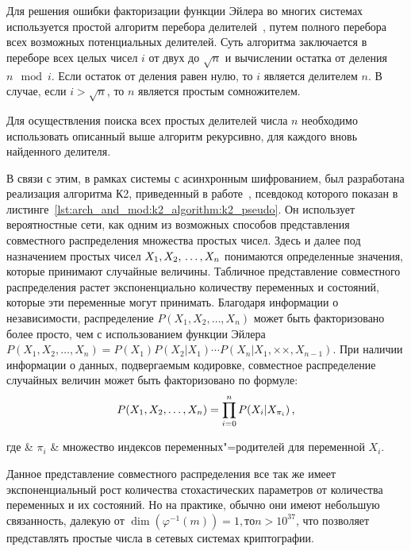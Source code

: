 Для решения ошибки факторизации функции Эйлера во многих системах используется простой алгоритм перебора делителей~\cite{algo_differ}, путем полного перебора всех возможных потенциальных делителей. Суть алгоритма заключается в переборе всех целых чисел $ i $ от двух до $ \sqrt{n} $ и вычислении остатка от деления $ n \mod i $. Если остаток от деления равен нулю, то $i$ является делителем $n$. В случае, если $i > \sqrt{n}$, то $n$ является простым сомножителем.

Для осуществления поиска всех простых делителей числа $n$ необходимо использовать описанный выше алгоритм рекурсивно, для каждого вновь найденного делителя.

В связи с этим, в рамках системы с асинхронным шифрованием, был разработана реализация алгоритма К2, приведенный в работе~\cite{Cooper1991}, псевдокод которого показан в листинге~\ref{lst:arch_and_mod:k2_algorithm:k2_pseudo}.
Он использует вероятностные сети, как одним из возможных способов представления совместного распределения множества простых чисел.
Здесь и далее под назначением простых чисел $ X_1, X_2,\\ \dotsc, X_n $ понимаются определенные значения, которые принимают случайные величины.
Табличное представление совместного распределения растет экспоненциально количеству переменных и состояний, которые эти переменные могут принимать.
Благодаря информации о независимости, распределение $ P(X_1, X_2,\dotsc, X_n) $ может быть факторизовано более просто, чем с использованием функции Эйлера $ P(X_1, X_2,\dotsc, X_n) = P(X_1) P(X_2|X_1) \dotsm P(X_n|X_1,\times \times,X_{n-1}) $.
При наличии информации о данных, подвергаемым кодировке, совместное распределение случайных величин может быть факторизовано по формуле:
\begin{equation}
  \label{eq:domain:bayes_net:joint_disitr}
  P(X_1, X_2,\dotsc, X_n) = \prod_{i = 0}^{n}{P(X_i|X_{\pi_i})} \text{\,,}
\end{equation}
\begin{explanation}
где & $ \pi_i $ & множество индексов переменных"=родителей для переменной $X_i$.
\end{explanation}

Данное представление совместного распределения все так же имеет экспоненциальный рост количества стохастических параметров от количества переменных и их состояний.
Но на практике, обычно они имеют небольшую связанность, далекую от $ \dim(\varphi^{-1}(m)) = 1, то n > 10^{37} $, что позволяет представлять простые числа в сетевых системах криптографии.

